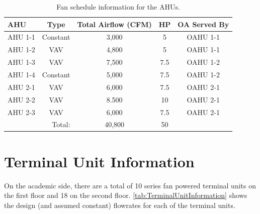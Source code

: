 \begin{table}
\centering
\caption{Fan schedule information for the AHUs.}
\label{tab:FanSched}
\begin{tabular}{l c c c c}
\toprule
AHU 	& Type	 	& Total Airflow (CFM) 	& HP 	& OA Served By\\
\midrule
AHU 1-1 & Constant  & 3,000 			  	& 5 	& OAHU 1-1 \\
AHU 1-2 & VAV 		& 4,800 				& 5 	& OAHU 1-1 \\
AHU 1-3 & VAV 		& 7,500 				& 7.5 	& OAHU 1-2 \\
AHU 1-4 & Constant 	& 5,000 				& 7.5 	& OAHU 1-2 \\
AHU 2-1 & VAV 		& 6,000 				& 7.5 	& OAHU 2-1 \\
AHU 2-2 & VAV		& 8.500					& 10 	& OAHU 2-1 \\
AHU 2-3 & VAV 		& 6,000					& 7.5	& OAHU 2-1 \\
\bottomrule
\multicolumn{2}{r}{Total:} & 40,800 & 50 &  \\
\end{tabular}
\end{table}

\section{Terminal Unit Information}

On the academic side, there are a total of 10 series fan powered
terminal units on the first floor and 18 on the second floor.
\tableref{} \ref{tab:TerminalUnitInformation} shows the design (and
assumed constant) flowrates for each of the terminal units. 

